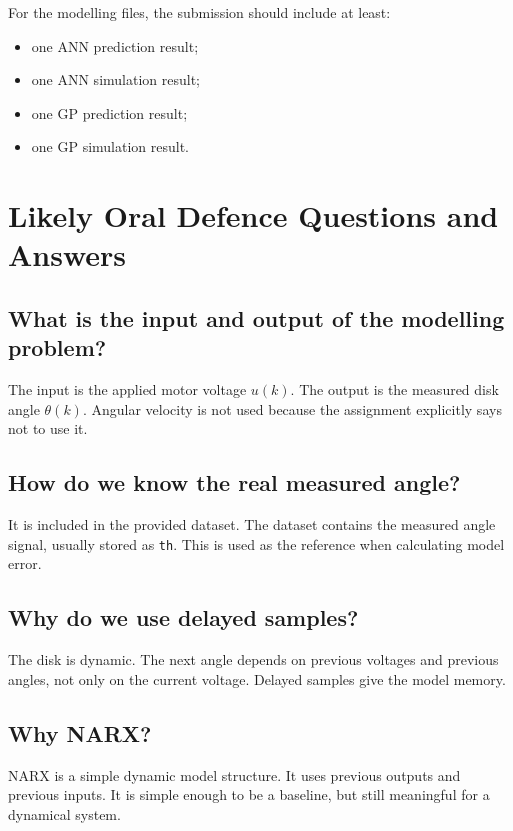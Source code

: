 \documentclass[11pt,a4paper]{article}
\begin{document}
For the modelling files, the submission should include at least:

\begin{itemize}
    \item one ANN prediction result;
    \item one ANN simulation result;
    \item one GP prediction result;
    \item one GP simulation result.
\end{itemize}

\section{Likely Oral Defence Questions and Answers}

\subsection*{What is the input and output of the modelling problem?}

The input is the applied motor voltage $u(k)$.
The output is the measured disk angle $\theta(k)$.
Angular velocity is not used because the assignment explicitly says not to use it.

\subsection*{How do we know the real measured angle?}

It is included in the provided dataset.
The dataset contains the measured angle signal, usually stored as \texttt{th}.
This is used as the reference when calculating model error.

\subsection*{Why do we use delayed samples?}

The disk is dynamic.
The next angle depends on previous voltages and previous angles, not only on the current voltage.
Delayed samples give the model memory.

\subsection*{Why NARX?}

NARX is a simple dynamic model structure.
It uses previous outputs and previous inputs.
It is simple enough to be a baseline, but still meaningful for a dynamical system.
\end{document}
